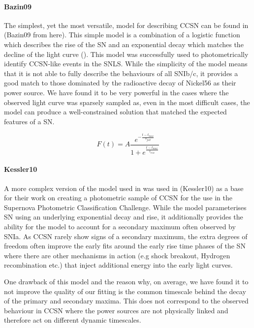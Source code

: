 \paragraph{Bazin09}
The simplest, yet the most versatile, model for describing CCSN can be found in \citet{Bazin2009} (Bazin09 from here). This simple model is a combination of a logistic function which describes the rise of the SN and an exponential decay which matches the decline of the light curve (). This model was successfully used to photometrically identify CCSN-like events in the SNLS. While the simplicity of the model means that it is not able to fully describe the behaviours of all SNIb/c, it provides a good match to those dominated by the radioactive decay of Nickel56 as their power source. We have found it to be very powerful in the cases where the observed light curve was sparsely sampled as, even in the most difficult cases, the model can produce a well-constrained solution that matched the expected features of a SN.

\begin{equation}
\label{eq:Bazin09}
  F(t) = A \frac{e^{-\frac{t - t_{max}}{\tau_{fall}}}} {1 + e^{\frac{t - t_{max}}{\tau_{rise}}}}
\end{equation}

\paragraph{Kessler10}
A more complex version of the model used in \citet{Bazin2009} was used in \citet{Kessler2010} (Kessler10) as a base for their work on creating a photometric sample of CCSN for the use in the Supernova Photometric Classification Challenge. While the model parameterises SN using an underlying exponential decay and rise, it additionally provides the ability for the model to account for a secondary maximum often observed by SNIa. As CCSN rarely show signs of a secondary maximum, the extra degrees of freedom often improve the early fits around the early rise time phases of the SN where there are other mechanisms in action (e.g shock breakout, Hydrogen recombination etc.) that inject additional energy into the early light curves.

One drawback of this model and the reason why, on average, we have found it to not improve the quality of our fitting is the common timescale behind the decay of the primary and secondary maxima. This does not correspond to the observed behaviour in CCSN where the power sources are not physically linked and therefore act on different dynamic timescales.

